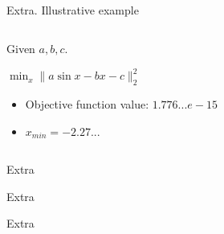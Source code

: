\documentclass[../main.tex]{subfiles}
\begin{document}
\begin{frame}[t]{Extra. Illustrative example}

\begin{columns}[T]
\begin{column}{0.35\linewidth}
Given $a, b, c$.

\hfill

$\min_x \|a\sin{x} - bx - c\|_2^2$

\begin{itemize}
\item Objective function value: $1.776...e-15$
\item $x_{min} = -2.27...$
\end{itemize}

\end{column}

\begin{column}{0.65\linewidth}

\end{column}
\end{columns}

\end{frame}

\begin{frame}[t]{Extra}
\end{frame}

\begin{frame}[t]{Extra}
\end{frame}

\begin{frame}[t]{Extra}
\end{frame}
\backupend
\end{document}
